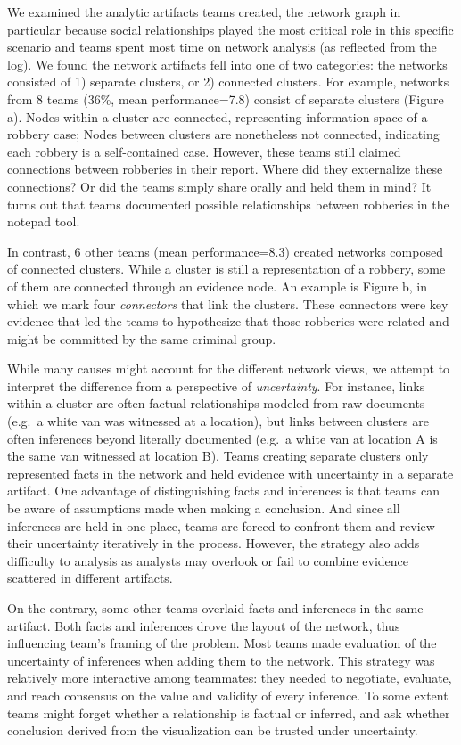 We examined the analytic artifacts teams created, the network
graph in particular because social relationships played the most
critical role in this specific scenario and teams spent most time on
network analysis (as reflected from the log). We found the network
artifacts fell into one of two categories: the networks consisted of 1)
separate clusters, or 2) connected clusters. For example, networks from
8 teams (36\%, mean performance=7.8) consist of separate clusters
(Figure \autocite{fig:network_cluster}a). Nodes within a cluster are
connected, representing information space of a robbery case; Nodes
between clusters are nonetheless not connected, indicating each robbery
is a self-contained case. However, these teams still claimed connections
between robberies in their report. Where did they externalize these
connections? Or did the teams simply share orally and held them in mind?
It turns out that teams documented possible relationships between
robberies in the notepad tool.

In contrast, 6 other teams (mean performance=8.3) created networks
composed of connected clusters. While a cluster is still a
representation of a robbery, some of them are connected through an
evidence node. An example is Figure \autocite{fig:network_cluster}b, in
which we mark four \emph{connectors} that link the clusters. These
connectors were key evidence that led the teams to hypothesize that
those robberies were related and might be committed by the same criminal
group.

While many causes might account for the different network views, we
attempt to interpret the difference from a perspective of
\emph{uncertainty}. For instance, links within a cluster are often
factual relationships modeled from raw documents (e.g.~a white van was
witnessed at a location), but links between clusters are often
inferences beyond literally documented (e.g.~a white van at location A
is the same van witnessed at location B). Teams creating separate
clusters only represented facts in the network and held evidence with
uncertainty in a separate artifact. One advantage of distinguishing
facts and inferences is that teams can be aware of assumptions made when
making a conclusion. And since all inferences are held in one place,
teams are forced to confront them and review their uncertainty
iteratively in the process. However, the strategy also adds difficulty
to analysis as analysts may overlook or fail to combine evidence
scattered in different artifacts.

On the contrary, some other teams overlaid facts and inferences in the
same artifact. Both facts and inferences drove the layout of the
network, thus influencing team's framing of the problem. Most teams made
evaluation of the uncertainty of inferences when adding them to the
network. This strategy was relatively more interactive among teammates:
they needed to negotiate, evaluate, and reach consensus on the value and
validity of every inference. To some extent teams might forget whether a
relationship is factual or inferred, and ask whether conclusion derived
from the visualization can be trusted under uncertainty.

